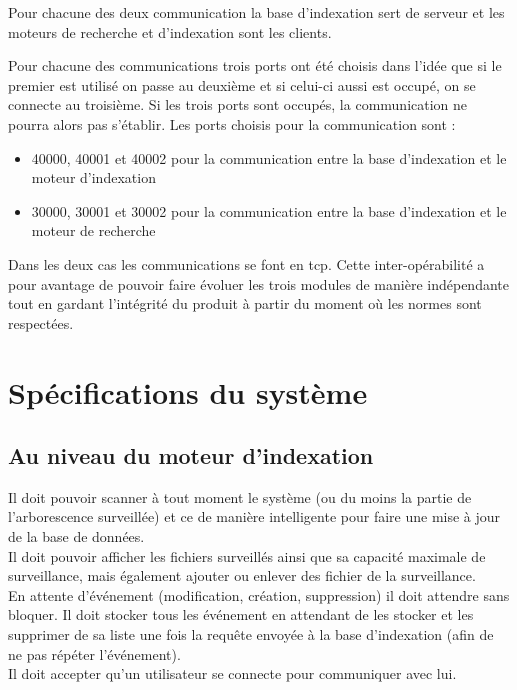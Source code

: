 \documentclass[a4paper,12pt]{report}
\begin{document}
Pour chacune des deux communication la base d'indexation sert de serveur et les moteurs de recherche et d'indexation sont les clients.

Pour chacune des communications trois ports ont été choisis dans l'idée que si le premier est utilisé on passe au deuxième et si celui-ci aussi est occupé, on se connecte au troisième. Si les trois ports sont occupés, la communication ne pourra alors pas s'établir. Les ports choisis pour la communication sont :
\begin{itemize}
\item 40000, 40001 et 40002 pour la communication entre la base d'indexation et le moteur d'indexation
\item 30000, 30001 et 30002 pour la communication entre la base d'indexation et le moteur de recherche
\end{itemize}
Dans les deux cas les communications se font en \gls{tcp}.
Cette inter-opérabilité a pour avantage de pouvoir faire évoluer les trois modules de manière indépendante tout en gardant l'intégrité du produit à partir du moment où les normes sont respectées.

\chapter{Spécifications du système}

\section{Au niveau du moteur d'indexation}
Il doit pouvoir scanner à tout moment le système (ou du moins la partie de l'\gls{arborescence} surveillée) et ce de manière intelligente pour faire une mise à jour de la base de données.\\
Il doit pouvoir afficher les \glspl{fichier} surveillés ainsi que sa capacité maximale de surveillance, mais également ajouter ou enlever des \gls{fichier} de la surveillance.\\
En attente d'événement (modification, création, suppression) il doit attendre sans bloquer. Il doit stocker tous les événement en attendant de les stocker et les supprimer de sa liste une fois la requête envoyée à la base d'indexation (afin de ne pas répéter l'événement).\\
Il doit accepter qu'un utilisateur se connecte pour communiquer avec lui.
\end{document}
